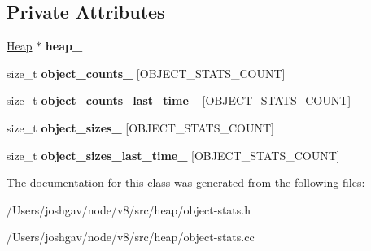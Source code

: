 \subsection*{Private Attributes}
\begin{DoxyCompactItemize}
\item 
\hyperlink{classv8_1_1internal_1_1_heap}{Heap} $\ast$ {\bfseries heap\+\_\+}\hypertarget{classv8_1_1internal_1_1_object_stats_abe6a95e46fbc44950f510331ef772e8f}{}\label{classv8_1_1internal_1_1_object_stats_abe6a95e46fbc44950f510331ef772e8f}

\item 
size\+\_\+t {\bfseries object\+\_\+counts\+\_\+} \mbox{[}O\+B\+J\+E\+C\+T\+\_\+\+S\+T\+A\+T\+S\+\_\+\+C\+O\+U\+NT\mbox{]}\hypertarget{classv8_1_1internal_1_1_object_stats_ab1d2fe3bc9f146ac82f01ffd0b349843}{}\label{classv8_1_1internal_1_1_object_stats_ab1d2fe3bc9f146ac82f01ffd0b349843}

\item 
size\+\_\+t {\bfseries object\+\_\+counts\+\_\+last\+\_\+time\+\_\+} \mbox{[}O\+B\+J\+E\+C\+T\+\_\+\+S\+T\+A\+T\+S\+\_\+\+C\+O\+U\+NT\mbox{]}\hypertarget{classv8_1_1internal_1_1_object_stats_a1bc7d26515e743b19c447a2dad314c00}{}\label{classv8_1_1internal_1_1_object_stats_a1bc7d26515e743b19c447a2dad314c00}

\item 
size\+\_\+t {\bfseries object\+\_\+sizes\+\_\+} \mbox{[}O\+B\+J\+E\+C\+T\+\_\+\+S\+T\+A\+T\+S\+\_\+\+C\+O\+U\+NT\mbox{]}\hypertarget{classv8_1_1internal_1_1_object_stats_aa57b885f877a96f35ff3f3d9829aeda2}{}\label{classv8_1_1internal_1_1_object_stats_aa57b885f877a96f35ff3f3d9829aeda2}

\item 
size\+\_\+t {\bfseries object\+\_\+sizes\+\_\+last\+\_\+time\+\_\+} \mbox{[}O\+B\+J\+E\+C\+T\+\_\+\+S\+T\+A\+T\+S\+\_\+\+C\+O\+U\+NT\mbox{]}\hypertarget{classv8_1_1internal_1_1_object_stats_a167186457d4ecc6a7bfd9766fca6e124}{}\label{classv8_1_1internal_1_1_object_stats_a167186457d4ecc6a7bfd9766fca6e124}

\end{DoxyCompactItemize}


The documentation for this class was generated from the following files\+:\begin{DoxyCompactItemize}
\item 
/\+Users/joshgav/node/v8/src/heap/object-\/stats.\+h\item 
/\+Users/joshgav/node/v8/src/heap/object-\/stats.\+cc\end{DoxyCompactItemize}
